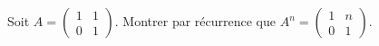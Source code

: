 

\begin{exercice}\label{exoINGE1121La0008}

	Soit $A=\begin{pmatrix}
		1	&	1	\\ 
		0	&	1	
	\end{pmatrix}$. Montrer par récurrence que $A^n=\begin{pmatrix}
		1	&	n	\\ 
		0	&	1	
	\end{pmatrix}$.

\end{exercice}
